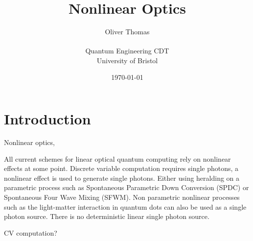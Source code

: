 \documentclass[12pt]{article}
\begin{document}

\title{Nonlinear Optics}
    \author{Oliver Thomas \\[0.5em] \\ Quantum Engineering CDT \\ University of Bristol}
    \date{\today}
    \maketitle

    \section{Introduction}

Nonlinear optics,


All current schemes for linear optical quantum computing rely on nonlinear effects at some point. Discrete variable computation requires single photons, a nonlinear effect is used to generate single photons. Either using heralding on a parametric process such as Spontaneous Parametric Down Conversion (SPDC) or Spontaneous Four Wave Mixing (SFWM). Non parametric nonlinear processes such as the light-matter interaction in quantum dots can also be used as a single photon source. There is no deterministic linear single photon source. 



CV computation?






\end{document}
